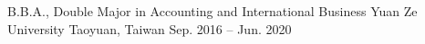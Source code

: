 
\begin{cventries}

\cventry
  {B.B.A., Double Major in Accounting and International Business}
  {Yuan Ze University}
  {Taoyuan, Taiwan}
  {Sep. 2016 -- Jun. 2020}
  {}

  \vspace{-8mm}

\end{cventries}
